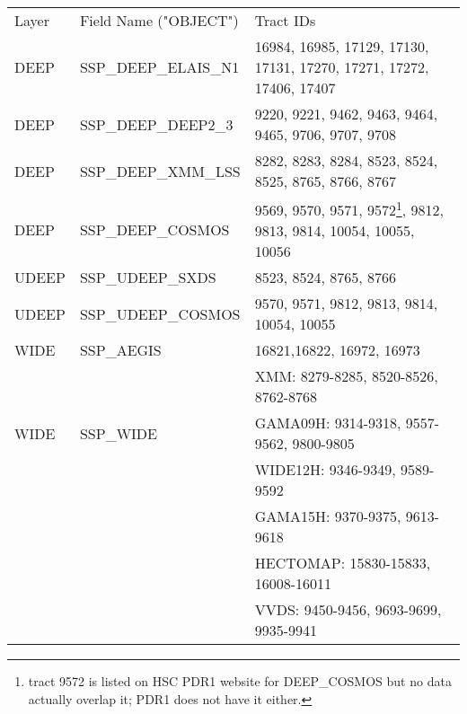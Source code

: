 \begin{tabular}{lll}
Layer & Field Name ("OBJECT") & Tract IDs \\
DEEP & SSP{\_}DEEP{\_}ELAIS{\_}N1 & 16984, 16985, 17129, 17130, 17131, 17270, 17271, 17272, 17406, 17407 \\
DEEP & SSP{\_}DEEP{\_}DEEP2{\_}3 & 9220, 9221, 9462, 9463, 9464, 9465, 9706, 9707, 9708 \\
DEEP & SSP{\_}DEEP{\_}XMM{\_}LSS & 8282, 8283, 8284, 8523, 8524, 8525, 8765, 8766, 8767 \\
DEEP & SSP{\_}DEEP{\_}COSMOS & 9569, 9570, 9571, 9572\footnote{tract 9572 is listed on HSC PDR1 website for DEEP{\_}COSMOS but no data actually overlap it; PDR1 does not have it either.}, 9812, 9813, 9814, 10054, 10055, 10056 \\
UDEEP&SSP{\_}UDEEP{\_}SXDS& 8523, 8524, 8765, 8766 \\
UDEEP & SSP{\_}UDEEP{\_}COSMOS& 9570, 9571, 9812, 9813, 9814, 10054, 10055 \\
WIDE&SSP{\_}AEGIS& 16821,16822, 16972, 16973 \\
\multirow{3}{*}{WIDE} & \multirow{3}{*}{SSP{\_}WIDE}
& XMM: 8279-8285, 8520-8526, 8762-8768 \\
&&GAMA09H: 9314-9318, 9557-9562, 9800-9805 \\
&&WIDE12H: 9346-9349, 9589-9592 \\
&&GAMA15H: 9370-9375, 9613-9618 \\
&&HECTOMAP: 15830-15833, 16008-16011 \\
&&VVDS: 9450-9456, 9693-9699, 9935-9941 \\
\end{tabular}
